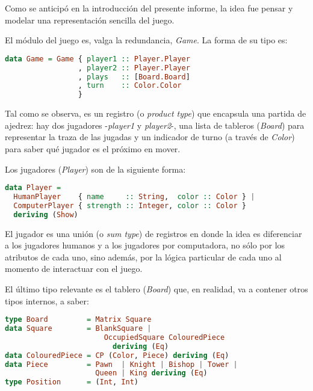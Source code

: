 \documentclass{llncs}
\begin{document}
Como se anticipó en la introducción del presente informe, la idea fue pensar y modelar una representación sencilla del juego.

El módulo del juego es, valga la redundancia, \textit{Game}. La forma de su tipo es:

\begin{lstlisting}[frame=single, language=haskell, captionpos=b, caption=Tipo de Game, label={lst:tipo_game}]
data Game = Game { player1 :: Player.Player
                 , player2 :: Player.Player
                 , plays   :: [Board.Board]
                 , turn    :: Color.Color
                 }
\end{lstlisting}

Tal como se observa, es un registro (o \textit{product type}) que encapsula una partida de ajedrez: hay dos jugadores -\textit{player1} y \textit{player2}-, una lista de tableros (\textit{Board}) para representar la traza de las jugadas y un indicador de turno (a través de \textit{Color}) para saber qué jugador es el próximo en mover.

Los jugadores (\textit{Player}) son de la siguiente forma:

\begin{lstlisting}[frame=single, language=haskell, captionpos=b, caption=Tipo de Player, label={lst:tipo_player}]
data Player =
  HumanPlayer    { name     :: String,  color :: Color } |
  ComputerPlayer { strength :: Integer, color :: Color }
  deriving (Show)
\end{lstlisting}

El jugador es una unión (o \textit{sum type}) de registros en donde la idea es diferenciar a los jugadores humanos y a los jugadores por computadora, no sólo por los atributos de cada uno, sino además, por la lógica particular de cada uno al momento de interactuar con el juego.

El último tipo relevante es el tablero (\textit{Board}) que, en realidad, va a contener otros tipos internos, a saber:

\begin{lstlisting}[frame=single, language=haskell, captionpos=b, caption=Tipo de Board y derivados, label={lst:tipo_board}]
type Board         = Matrix Square
data Square        = BlankSquare |
                       OccupiedSquare ColouredPiece
                         deriving (Eq)
data ColouredPiece = CP (Color, Piece) deriving (Eq)
data Piece         = Pawn  | Knight | Bishop | Tower |
                     Queen | King deriving (Eq)
type Position      = (Int, Int)
\end{lstlisting}
\end{document}
